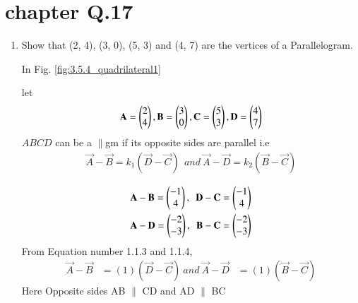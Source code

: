 \documentclass[journal,12pt,twocolumn]{IEEEtran}
\renewcommand\thesection{\arabic{section}}
\begin{document}
\renewcommand{\thefigure}{\theenumi}
\renewcommand{\thetable}{\theenumi}




\section{ chapter   Q.17 }
\renewcommand{\theequation}{\theenumi}
\begin{enumerate}[label=\thesection.\arabic*.,ref=\thesection.\theenumi]


\item Show that (2, 4), (3, 0), (5, 3) and (4, 7) are the vertices of a Parallelogram.

\solution
\newline In Fig. 	\ref{fig:3.5.4_quadrilateral1}

let \begin{align}
    \mathbf{A} = \begin{pmatrix}2\\4\end{pmatrix}, \mathbf{B} = \begin{pmatrix}3\\0\end{pmatrix}, \mathbf{C} = \begin{pmatrix}5\\3\end{pmatrix}, \mathbf{D} = \begin{pmatrix}4\\7\end{pmatrix}
\end{align}
$ABCD$ can be a $\parallel$gm if its opposite sides are parallel i.e
\begin{align}
    \vec{A} - \vec{B} = k_1 ( \vec{D} - \vec{C} )\ ~ and ~
    \vec{A} - \vec{D} = k_2 ( \vec{B} - \vec{C} ) 
\end{align}

\begin{align}
\label{eq:constr_vectors_quad1_ABCD}
\mathbf{A} - \mathbf{B} = \begin{pmatrix}-1\\4\end{pmatrix},~~
\mathbf{D} - \mathbf{C} = \begin{pmatrix}-1\\4\end{pmatrix}
\\
\mathbf {A} - \mathbf {D} = \begin{pmatrix}-2\\-3\end{pmatrix},~~
\mathbf {B} - \mathbf {C} =\begin{pmatrix}-2\\-3\end{pmatrix}
\label{eq:constr_vectors_quad1_ABCD}
\end{align}
From Equation number 1.1.3 and 1.1.4,
\begin{align}
    \vec{A} - \vec{B} &= (1) ( \vec{D} - \vec{C} ) ~and~
    \vec{A} - \vec{D}& = (1) ( \vec{B} - \vec{C} ) 
\end{align}
Here Opposite sides AB $\parallel$ CD and AD $\parallel$ BC 


\end{enumerate}
\end{document}
